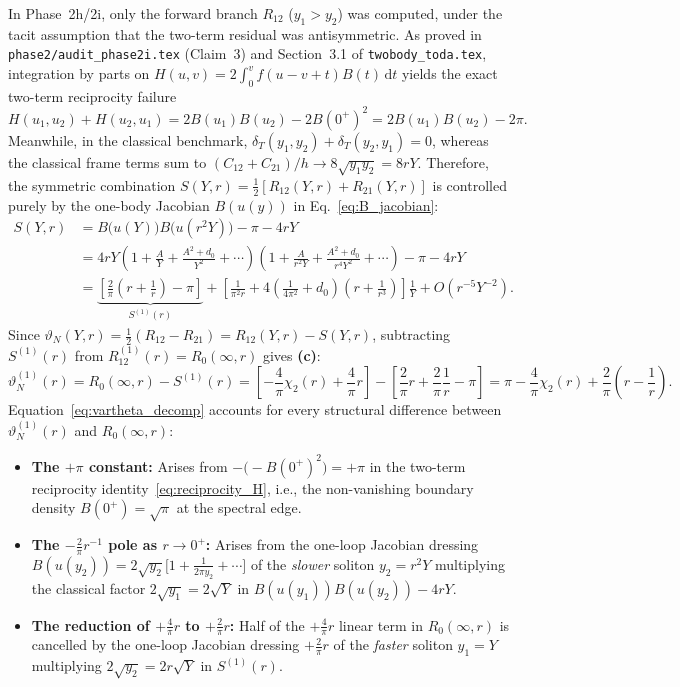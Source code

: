 \documentclass[11pt,a4paper]{article}
\newcommand{\dd}{\mathrm{d}}
\begin{document}
In Phase~2h/2i, only the forward branch $R_{12}$ ($y_1>y_2$) was computed, under the tacit assumption that the two-term residual was antisymmetric. As proved in \texttt{phase2/audit\_phase2i.tex} (Claim~3) and Section~3.1 of \texttt{twobody\_toda.tex}, integration by parts on $H(u,v)=2\int_0^v f(u-v+t)B(t)\,\dd t$ yields the exact two-term reciprocity failure
\begin{equation}\label{eq:reciprocity_H}
  H(u_1,u_2) + H(u_2,u_1) = 2B(u_1)B(u_2) - 2B(0^+)^2 = 2B(u_1)B(u_2) - 2\pi.
\end{equation}
Meanwhile, in the classical benchmark, $\delta_T(y_1,y_2)+\delta_T(y_2,y_1)=0$, whereas the classical frame terms sum to $(C_{12}+C_{21})/h \to 8\sqrt{y_1 y_2}=8rY$. Therefore, the symmetric combination $S(Y,r)=\frac12[R_{12}(Y,r)+R_{21}(Y,r)]$ is controlled purely by the one-body Jacobian $B(u(y))$ in Eq.~\eqref{eq:B_jacobian}:
\begin{align}
  S(Y,r) &= B\bigl(u(Y)\bigr)B\bigl(u(r^2Y)\bigr) - \pi - 4rY \nonumber\\
  &= 4rY\left(1 + \frac{A}{Y} + \frac{A^2+d_0}{Y^2} + \cdots\right)\!\left(1 + \frac{A}{r^2Y} + \frac{A^2+d_0}{r^4Y^2} + \cdots\right) - \pi - 4rY \nonumber\\
  &= \underbrace{\left[\frac{2}{\pi}\!\left(r + \frac{1}{r}\right) - \pi\right]}_{S^{(1)}(r)} + \left[\frac{1}{\pi^2 r} + 4\!\left(\frac{1}{4\pi^2}+d_0\right)\!\left(r + \frac{1}{r^3}\right)\right]\frac{1}{Y} + O(r^{-5}Y^{-2}). \label{eq:S_expansion}
\end{align}
Since $\vartheta_N(Y,r)=\frac12(R_{12}-R_{21}) = R_{12}(Y,r) - S(Y,r)$, subtracting $S^{(1)}(r)$ from $R_{12}^{(1)}(r)=R_0(\infty,r)$ gives \textbf{(c)}:
\begin{equation}\label{eq:vartheta_decomp}
  \vartheta_N^{(1)}(r) = R_0(\infty,r) - S^{(1)}(r) = \left[-\frac{4}{\pi}\chi_2(r) + \frac{4}{\pi}r\right] - \left[\frac{2}{\pi}r + \frac{2}{\pi}\frac{1}{r} - \pi\right] = \pi - \frac{4}{\pi}\chi_2(r) + \frac{2}{\pi}\!\left(r - \frac{1}{r}\right).
\end{equation}
Equation~\eqref{eq:vartheta_decomp} accounts for every structural difference between $\vartheta_N^{(1)}(r)$ and $R_0(\infty,r)$:
\begin{itemize}[leftmargin=2em]
  \item \textbf{The $+\pi$ constant:} Arises from $-\bigl(-B(0^+)^2\bigr)=+\pi$ in the two-term reciprocity identity~\eqref{eq:reciprocity_H}, i.e., the non-vanishing boundary density $B(0^+)=\sqrt{\pi}$ at the spectral edge.
  \item \textbf{The $-\frac{2}{\pi}r^{-1}$ pole as $r\to 0^+$:} Arises from the one-loop Jacobian dressing $B(u(y_2))=2\sqrt{y_2}\bigl[1+\frac{1}{2\pi y_2}+\cdots\bigr]$ of the \emph{slower} soliton $y_2=r^2Y$ multiplying the classical factor $2\sqrt{y_1}=2\sqrt{Y}$ in $B(u(y_1))B(u(y_2))-4rY$.
  \item \textbf{The reduction of $+\frac{4}{\pi}r$ to $+\frac{2}{\pi}r$:} Half of the $+\frac{4}{\pi}r$ linear term in $R_0(\infty,r)$ is cancelled by the one-loop Jacobian dressing $+\frac{2}{\pi}r$ of the \emph{faster} soliton $y_1=Y$ multiplying $2\sqrt{y_2}=2r\sqrt{Y}$ in $S^{(1)}(r)$.
\end{itemize}
\end{document}
